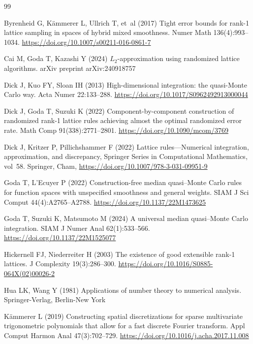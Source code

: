 \documentclass[pdflatex,sn-basic,Numbered]{sn-jnl}%
\theoremstyle{thmstyleone}%
\theoremstyle{thmstyletwo}%
\begin{document}
\begin{thebibliography}{99}
\providecommand{\doi}[1]{\url{https://doi.org/#1}}

Byrenheid G, K\"ammerer L, Ullrich T, et~al (2017) Tight error bounds for
  rank-1 lattice sampling in spaces of hybrid mixed smoothness. Numer Math
  136(4):993--1034. \doi{10.1007/s00211-016-0861-7}

Cai M, Goda T, Kazashi Y (2024) {$L_2$}-approximation using randomized lattice
  algorithms. arXiv preprint arXiv:240918757

Dick J, Kuo FY, Sloan IH (2013) High-dimensional integration: the quasi-Monte
  Carlo way. Acta Numer 22:133--288. \doi{10.1017/S0962492913000044}

Dick J, Goda T, Suzuki K (2022{}) Component-by-component
  construction of randomized rank-1 lattice rules achieving almost the optimal
  randomized error rate. Math Comp 91(338):2771--2801. \doi{10.1090/mcom/3769}

Dick J, Kritzer P, Pillichshammer F (2022{}) Lattice
  rules---Numerical integration, approximation, and discrepancy, Springer
  Series in Computational Mathematics, vol~58. Springer, Cham,
  \doi{10.1007/978-3-031-09951-9}

Goda T, L'Ecuyer P (2022) Construction-free median quasi--{M}onte {C}arlo rules
  for function spaces with unspecified smoothness and general weights. SIAM J
  Sci Comput 44(4):A2765--A2788. \doi{10.1137/22M1473625}

Goda T, Suzuki K, Matsumoto M (2024) A universal median quasi--{M}onte {C}arlo
  integration. SIAM J Numer Anal 62(1):533--566. \doi{10.1137/22M1525077}

Hickernell FJ, Niederreiter H (2003) The existence of good extensible rank-1
  lattices. J Complexity 19(3):286--300. \doi{10.1016/S0885-064X(02)00026-2}

Hua LK, Wang Y (1981) Applications of number theory to numerical analysis.
  Springer-Verlag, Berlin-New York

K\"ammerer L (2019) Constructing spatial discretizations for sparse
  multivariate trigonometric polynomials that allow for a fast discrete
  {F}ourier transform. Appl Comput Harmon Anal 47(3):702--729.
  \doi{10.1016/j.acha.2017.11.008}


\end{thebibliography}
\end{document}
